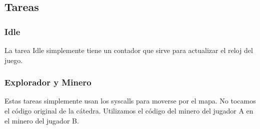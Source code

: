 \subsection{Tareas}

\subsubsection{Idle}
La tarea Idle simplemente tiene un contador que sirve  para actualizar el reloj del juego.

\subsubsection{Explorador y Minero}
Estas tareas simplemente usan los syscalls para moverse por el mapa. No tocamos el código original de la cátedra. Utilizamos el código del minero del jugador A en el minero del jugador B.
